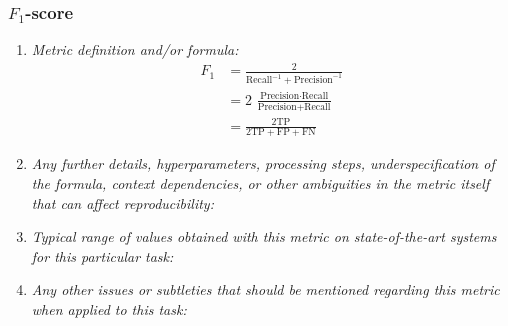 \documentclass[a4paper,11pt]{article}
\begin{document}
        \subsubsection{$F_1$-score}
            \begin{enumerate}[label=\alph*.]
                \item \textit{Metric definition and/or formula:}
                    \begin{align}
                        F_1 &= \frac{2}{\textrm{Recall}^{-1} + \textrm{Precision}^{-1}}\\
                        &= 2\ \frac{\textrm{Precision} \cdot \textrm{Recall}}{\textrm{Precision} + \textrm{Recall}}\\
                        &= \frac{2\textrm{TP}}{2\textrm{TP} + \textrm{FP} + \textrm{FN}}
                    \end{align}
                \bigskip
                \item \textit{Any further details, hyperparameters, processing steps, underspecification of the formula, context dependencies, or other ambiguities in the metric itself that can affect reproducibility:}
                \bigskip
                \item \textit{Typical range of values obtained with this metric on state-of-the-art systems for this particular task:}
                \bigskip
                \item \textit{Any other issues or subtleties that should be mentioned regarding this metric when applied to this task:}
                \bigskip
            \end{enumerate}
\end{document}
